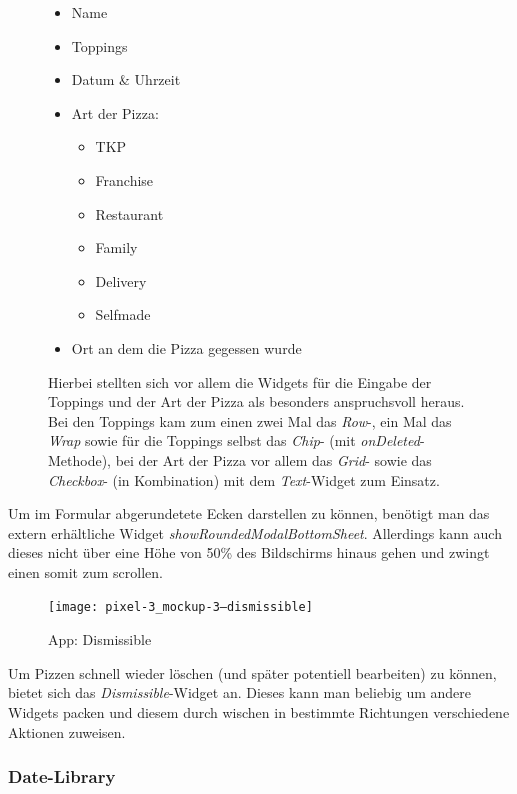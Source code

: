 \begin{figure}[H]
        \begin{itemize}
            \itemsep-0.4em
            \item Name
            \item Toppings
            \item Datum \& Uhrzeit
            \item Art der Pizza:
            \begin{itemize}
                \itemsep-0.4em
                \item \ac{TKP}
                \item Franchise
                \item Restaurant
                \item Family
                \item Delivery
                \item Selfmade
            \end{itemize}
            \item Ort an dem die Pizza gegessen wurde
        \end{itemize}

        Hierbei stellten sich vor allem die Widgets für die
        Eingabe der Toppings und der Art der Pizza als besonders
        anspruchsvoll heraus. Bei den Toppings kam zum einen
        zwei Mal das \textit{Row}-, ein Mal das \textit{Wrap}
        sowie für die Toppings selbst das \textit{Chip}-
        (mit \textit{onDeleted}-Methode), bei der
        Art der Pizza vor allem das \textit{Grid}- sowie
        das \textit{Checkbox}- (in Kombination) mit dem \textit{Text}-Widget
        zum Einsatz.
    \endminipage\hfill
\end{figure}
Um im Formular abgerundetete Ecken darstellen zu können, benötigt man
das extern erhältliche Widget \textit{showRoundedModalBottomSheet}.
Allerdings kann auch dieses nicht über eine Höhe von 50\% des Bildschirms
hinaus gehen und zwingt einen somit zum scrollen.

\begin{figure}[H]
    \centering
    \texttt{[image: pixel-3\_mockup-3--dismissible]}
    \caption{App: Dismissible}
\end{figure}

Um Pizzen schnell wieder löschen (und später potentiell bearbeiten)
zu können, bietet sich das \textit{Dismissible}-Widget an.
Dieses kann man beliebig um andere Widgets packen und diesem
durch wischen in bestimmte Richtungen verschiedene Aktionen zuweisen.

\subsubsection{Date-Library}

